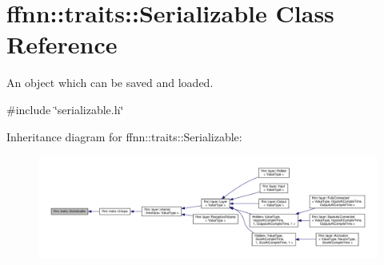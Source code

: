\hypertarget{classffnn_1_1traits_1_1_serializable}{\section{ffnn\-:\-:traits\-:\-:Serializable Class Reference}
\label{classffnn_1_1traits_1_1_serializable}
}


An object which can be saved and loaded.  




{\ttfamily \#include \char`\"{}serializable.\-h\char`\"{}}



Inheritance diagram for ffnn\-:\-:traits\-:\-:Serializable\-:
\nopagebreak
\begin{figure}[H]
\begin{center}
\leavevmode
\includegraphics[width=350pt]{classffnn_1_1traits_1_1_serializable__inherit__graph}
\end{center}
\end{figure}

